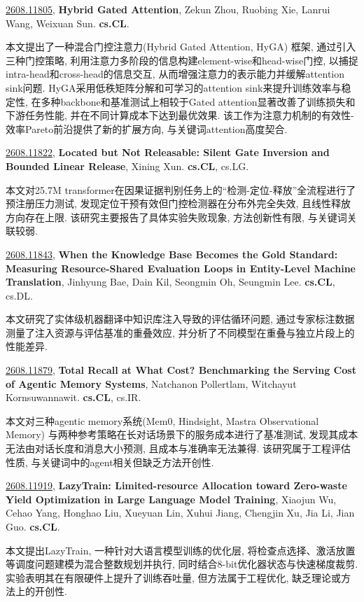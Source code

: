 \documentclass[9pt, a4paper]{article}
\theoremstyle{plain}
\theoremstyle{definition}
\theoremstyle{remark}
\newcommand{\arxivwithtarget}[3]{\hypertarget{#1}{}\href{https://arxiv.org/abs/#1}{#1}, \textbf{\textcolor{arxivblue}{#2}}, #3. }
\begin{document}
\arxivwithtarget{2608.11805}{Hybrid Gated Attention}{Zekun Zhou, Ruobing Xie, Lanrui Wang, Weixuan Sun}\textbf{cs.CL}.

本文提出了一种混合门控注意力(Hybrid Gated Attention, HyGA) 框架, 通过引入三种门控策略, 利用注意力多阶段的信息构建element-wise和head-wise门控, 以捕捉intra-head和cross-head的信息交互, 从而增强注意力的表示能力并缓解attention sink问题. HyGA采用低秩矩阵分解和可学习的attention sink来提升训练效率与稳定性, 在多种backbone和基准测试上相较于Gated attention显著改善了训练损失和下游任务性能, 并在不同计算成本下达到最优效果. 该工作为注意力机制的有效性-效率Pareto前沿提供了新的扩展方向, 与关键词attention高度契合.


\arxivwithtarget{2608.11822}{Located but Not Releasable: Silent Gate Inversion and Bounded Linear Release}{Xining Xun}\textbf{cs.CL}, cs.LG.

本文对25.7M transformer在因果证据判别任务上的“检测-定位-释放”全流程进行了预注册压力测试, 发现定位干预有效但门控检测器在分布外完全失效, 且线性释放方向存在上限. 该研究主要报告了具体实验失败现象, 方法创新性有限, 与关键词关联较弱.


\arxivwithtarget{2608.11843}{When the Knowledge Base Becomes the Gold Standard: Measuring Resource-Shared Evaluation Loops in Entity-Level Machine Translation}{Jinhyung Bae, Dain Kil, Seongmin Oh, Seungmin Lee}\textbf{cs.CL}, cs.DL.

本文研究了实体级机器翻译中知识库注入导致的评估循环问题, 通过专家标注数据测量了注入资源与评估基准的重叠效应, 并分析了不同模型在重叠与独立片段上的性能差异.


\arxivwithtarget{2608.11879}{Total Recall at What Cost? Benchmarking the Serving Cost of Agentic Memory Systems}{Natchanon Pollertlam, Witchayut Kornsuwannawit}\textbf{cs.CL}, cs.IR.

本文对三种agentic memory系统(Mem0, Hindsight, Mastra Observational Memory) 与两种参考策略在长对话场景下的服务成本进行了基准测试, 发现其成本无法由对话长度和消息大小预测, 且成本与准确率无法兼得. 该研究属于工程评估性质, 与关键词中的agent相关但缺乏方法开创性.


\arxivwithtarget{2608.11919}{LazyTrain: Limited-resource Allocation toward Zero-waste Yield Optimization in Large Language Model Training}{Xiaojun Wu, Cehao Yang, Honghao Liu, Xueyuan Lin, Xuhui Jiang, Chengjin Xu, Jia Li, Jian Guo}\textbf{cs.CL}.

本文提出LazyTrain, 一种针对大语言模型训练的优化层, 将检查点选择、激活放置等调度问题建模为混合整数规划并执行, 同时结合8-bit优化器状态与快速梯度裁剪. 实验表明其在有限硬件上提升了训练吞吐量, 但方法属于工程优化, 缺乏理论或方法上的开创性.
\end{document}
